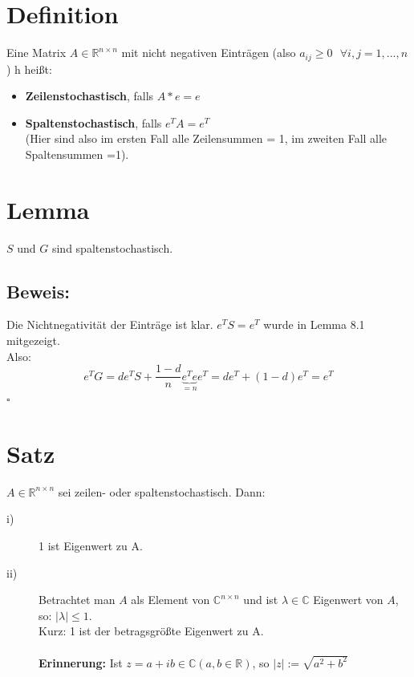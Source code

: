 \documentclass{scrbook}
\begin{document}
\section{Definition}
Eine Matrix $A\in \mathbb{R}^{n \times n}$ mit nicht negativen Einträgen (also $a_{ij} \geq 0 \text{ } \forall i,j = 1,...,n$) h heißt:
\begin{itemize}
\item \textbf{Zeilenstochastisch}, falls $A*e=e$
\item \textbf{Spaltenstochastisch}, falls $e^T A= e^T$\\
(Hier sind also im ersten Fall alle Zeilensummen = 1, im zweiten Fall alle Spaltensummen =1).
\end{itemize}
\section{Lemma}
$S$ und $G$ sind spaltenstochastisch.
\subsection*{Beweis:}
Die Nichtnegativität der Einträge ist klar. $e^TS=e^T$ wurde in Lemma 8.1 mitgezeigt.\\Also:
\[e^TG=de^TS+\frac{1-d}{n}\underbrace{e^Te}_{=n}e^T = d e^T+(1-d)e^T = e^T\]$\square$
\section{Satz}
$A\in \mathbb{R}^{n \times n}$ sei zeilen- oder spaltenstochastisch. Dann:
\begin{description}
\item[i)] 1 ist Eigenwert zu A.
\item[ii)] Betrachtet man $A$ als Element von $\mathbb{C}^{n\times n}$ und ist $\lambda \in \mathbb{C}$ Eigenwert von $A$, so: $|\lambda|\leq 1$.\\
Kurz: 1 ist der betragsgrößte Eigenwert zu A.\\\\
\textbf{Erinnerung:} Ist $z = a+ib \in \mathbb{C} (a,b\in \mathbb{R})$, so $|z| :=\sqrt{a^2+b^2}$
\end{description}
\end{document}
